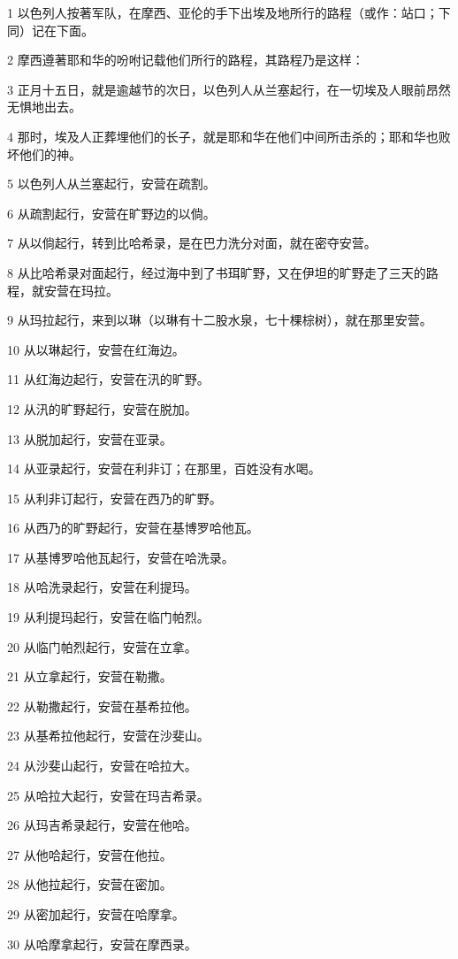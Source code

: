 \par 1 以色列人按著军队，在摩西、亚伦的手下出埃及地所行的路程（或作：站口；下同）记在下面。
\par 2 摩西遵著耶和华的吩咐记载他们所行的路程，其路程乃是这样：
\par 3 正月十五日，就是逾越节的次日，以色列人从兰塞起行，在一切埃及人眼前昂然无惧地出去。
\par 4 那时，埃及人正葬埋他们的长子，就是耶和华在他们中间所击杀的；耶和华也败坏他们的神。
\par 5 以色列人从兰塞起行，安营在疏割。
\par 6 从疏割起行，安营在旷野边的以倘。
\par 7 从以倘起行，转到比哈希录，是在巴力洗分对面，就在密夺安营。
\par 8 从比哈希录对面起行，经过海中到了书珥旷野，又在伊坦的旷野走了三天的路程，就安营在玛拉。
\par 9 从玛拉起行，来到以琳（以琳有十二股水泉，七十棵棕树），就在那里安营。
\par 10 从以琳起行，安营在红海边。
\par 11 从红海边起行，安营在汛的旷野。
\par 12 从汛的旷野起行，安营在脱加。
\par 13 从脱加起行，安营在亚录。
\par 14 从亚录起行，安营在利非订；在那里，百姓没有水喝。
\par 15 从利非订起行，安营在西乃的旷野。
\par 16 从西乃的旷野起行，安营在基博罗哈他瓦。
\par 17 从基博罗哈他瓦起行，安营在哈洗录。
\par 18 从哈洗录起行，安营在利提玛。
\par 19 从利提玛起行，安营在临门帕烈。
\par 20 从临门帕烈起行，安营在立拿。
\par 21 从立拿起行，安营在勒撒。
\par 22 从勒撒起行，安营在基希拉他。
\par 23 从基希拉他起行，安营在沙斐山。
\par 24 从沙斐山起行，安营在哈拉大。
\par 25 从哈拉大起行，安营在玛吉希录。
\par 26 从玛吉希录起行，安营在他哈。
\par 27 从他哈起行，安营在他拉。
\par 28 从他拉起行，安营在密加。
\par 29 从密加起行，安营在哈摩拿。
\par 30 从哈摩拿起行，安营在摩西录。

